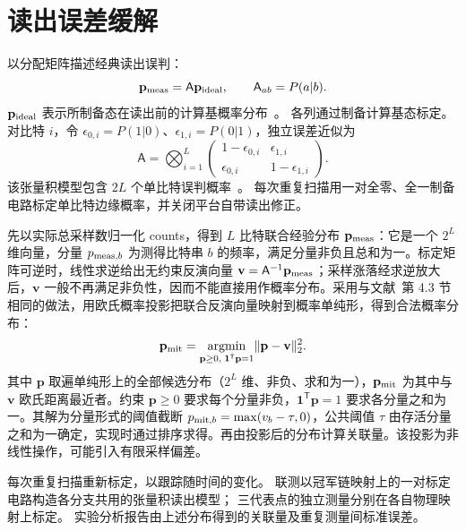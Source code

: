 \section{读出误差缓解}
\label{sec:readout}

以分配矩阵描述经典读出误判：
\begin{equation}
\mathbf p_{\rm meas}=\mathsf A\mathbf p_{\rm ideal},
\qquad \mathsf A_{ab}=P(a|b).
\label{eq:assignment}
\end{equation}
$\mathbf p_{\rm ideal}$ 表示所制备态在读出前的计算基概率分布~\cite{cai2023quantum}。
各列通过制备计算基态标定。
对比特 $i$，令 $\epsilon_{0,i}=P(1|0)$、$\epsilon_{1,i}=P(0|1)$，独立误差近似为
\begin{equation}
\mathsf A=\bigotimes_{i=1}^L
\begin{pmatrix}
1-\epsilon_{0,i}&\epsilon_{1,i}\\
\epsilon_{0,i}&1-\epsilon_{1,i}
\end{pmatrix}.
\label{eq:tensor-readout}
\end{equation}
该张量积模型包含 $2L$ 个单比特误判概率~\cite{bravyi2021mitigating}。
每次重复扫描用一对全零、全一制备电路标定单比特边缘概率，并关闭平台自带读出修正。

先以实际总采样数归一化 counts，得到 $L$ 比特联合经验分布 $\mathbf p_{\rm meas}$：它是一个 $2^L$ 维向量，分量 $p_{{\rm meas},b}$ 为测得比特串 $b$ 的频率，满足分量非负且总和为一。标定矩阵可逆时，线性求逆给出无约束反演向量 $\mathbf v=\mathsf A^{-1}\mathbf p_{\rm meas}$；采样涨落经求逆放大后，$\mathbf v$ 一般不再满足非负性，因而不能直接用作概率分布。采用与文献~\cite{maciejewski2020mitigation}第 4.3 节相同的做法，用欧氏概率投影把联合反演向量映射到概率单纯形，得到合法概率分布：
\begin{equation}
\mathbf p_{\rm mit}
=\underset{\mathbf p\ge0,\;\mathbf 1^{\mathsf T}\mathbf p=1}
{\operatorname{argmin}}\lVert\mathbf p-\mathbf v\rVert_2^2.
\label{eq:readout-projection}
\end{equation}
其中 $\mathbf p$ 取遍单纯形上的全部候选分布（$2^L$ 维、非负、求和为一），$\mathbf p_{\rm mit}$ 为其中与 $\mathbf v$ 欧氏距离最近者。约束 $\mathbf p\ge0$ 要求每个分量非负，$\mathbf 1^{\mathsf T}\mathbf p=1$ 要求各分量之和为一。其解为分量形式的阈值截断 $p_{{\rm mit},b}=\max(v_b-\tau,0)$，公共阈值 $\tau$ 由存活分量之和为一确定，实现时通过排序求得。再由投影后的分布计算关联量。该投影为非线性操作，可能引入有限采样偏差。

每次重复扫描重新标定，以跟踪随时间的变化。
联测以冠军链映射上的一对标定电路构造各分支共用的张量积读出模型；
三代表点的独立测量分别在各自物理映射上标定。
实验分析报告由上述分布得到的关联量及重复测量间标准误差。
